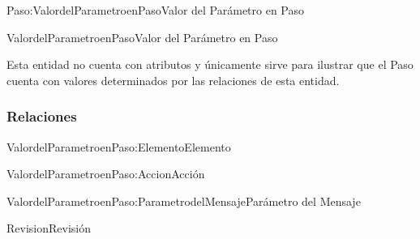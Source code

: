 \begin{BusinessFact}{Paso:ValordelParametroenPaso}{Valor del Parámetro en Paso}
\end{BusinessFact}

\clearpage
\begin{BusinessEntity}{ValordelParametroenPaso}{Valor del Parámetro en Paso}
	\item Esta entidad no cuenta con atributos y únicamente sirve para ilustrar que el Paso cuenta con valores determinados por las relaciones de esta entidad.
\end{BusinessEntity}

\subsubsection{Relaciones}

\begin{BusinessFact}{ValordelParametroenPaso:Elemento}{Elemento}
\end{BusinessFact}

\begin{BusinessFact}{ValordelParametroenPaso:Accion}{Acción}
\end{BusinessFact}

\begin{BusinessFact}{ValordelParametroenPaso:ParametrodelMensaje}{Parámetro del Mensaje}
\end{BusinessFact}


\begin{BusinessEntity}{Revision}{Revisión}
\end{BusinessEntity}

